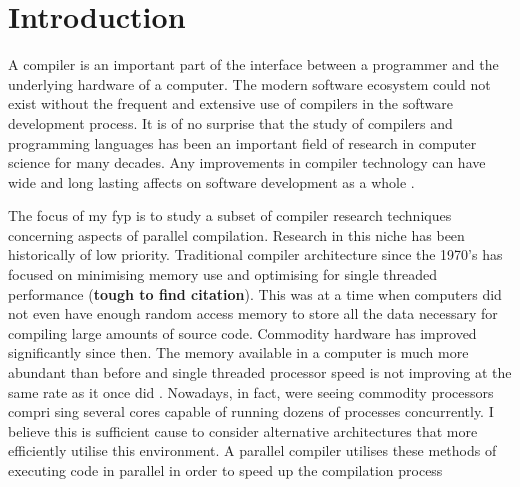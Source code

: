 \chapter{Introduction} \label{introduction}

A \gls{compiler} is an important part of the interface between a programmer
and the underlying hardware of a computer. The modern software ecosystem
could not exist without the frequent and extensive use of compilers in
the software development process. It is of no surprise that the study of
compilers and programming languages has been an important field of research
in computer science for many decades. Any improvements in compiler technology
can have wide and long lasting affects on software development as a whole
\citep{hall_compiler_2009}.

The focus of my \gls{fyp} is to study a subset of compiler research techniques
concerning aspects of parallel compilation. Research in this niche has been
historically of low priority. Traditional compiler architecture since the
1970’s has focused on minimising memory use and optimising for single threaded
performance (\textbf{tough to find citation}). This was at a time when computers
did not even have enough random access memory to store all the data necessary
for compiling large amounts of source code. Commodity hardware has improved
significantly since then. The memory available in a computer is much more
abundant than before and single threaded processor speed is not improving at
the same rate as it once did \citep{shalf_future_2020, williams_whats_2017}.
Nowadays, in fact, were seeing commodity processors compri sing several
cores capable of running dozens of processes concurrently. I believe this is
sufficient cause to consider alternative architectures that more efficiently
utilise this environment. A parallel compiler utilises these methods of
executing code in parallel in order to speed up the compilation process

